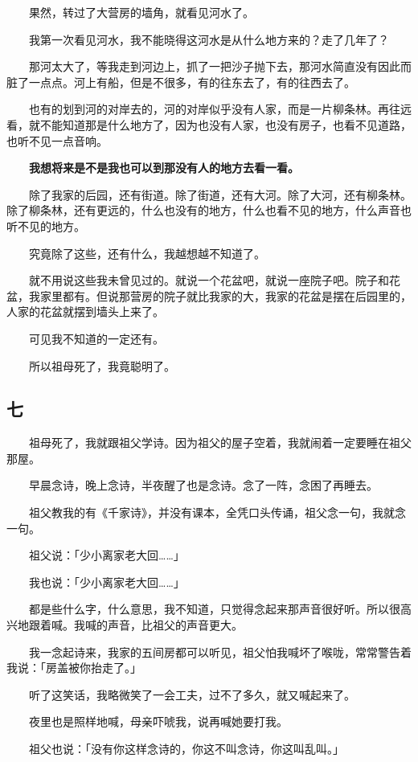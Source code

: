\documentclass[UTF8]{ctexart}
\begin{document}
　　果然，转过了大营房的墙角，就看见河水了。

　　我第一次看见河水，我不能晓得这河水是从什么地方来的？走了几年了？

　　那河太大了，等我走到河边上，抓了一把沙子抛下去，那河水简直没有因此而脏了一点点。河上有船，但是不很多，有的往东去了，有的往西去了。

　　也有的划到河的对岸去的，河的对岸似乎没有人家，而是一片柳条林。再往远看，就不能知道那是什么地方了，因为也没有人家，也没有房子，也看不见道路，也听不见一点音响。

　　\textbf{我想将来是不是我也可以到那没有人的地方去看一看。}

　　除了我家的后园，还有街道。除了街道，还有大河。除了大河，还有柳条林。除了柳条林，还有更远的，什么也没有的地方，什么也看不见的地方，什么声音也听不见的地方。

　　究竟除了这些，还有什么，我越想越不知道了。

　　就不用说这些我未曾见过的。就说一个花盆吧，就说一座院子吧。院子和花盆，我家里都有。但说那营房的院子就比我家的大，我家的花盆是摆在后园里的，人家的花盆就摆到墙头上来了。

　　可见我不知道的一定还有。

　　所以祖母死了，我竟聪明了。

\subsection{七}

　　祖母死了，我就跟祖父学诗。因为祖父的屋子空着，我就闹着一定要睡在祖父那屋。

　　早晨念诗，晚上念诗，半夜醒了也是念诗。念了一阵，念困了再睡去。

　　祖父教我的有《千家诗》，并没有课本，全凭口头传诵，祖父念一句，我就念一句。

　　祖父说：「少小离家老大回……」

　　我也说：「少小离家老大回……」

　　都是些什么字，什么意思，我不知道，只觉得念起来那声音很好听。所以很高兴地跟着喊。我喊的声音，比祖父的声音更大。

　　我一念起诗来，我家的五间房都可以听见，祖父怕我喊坏了喉咙，常常警告着我说：「房盖被你抬走了。」

　　听了这笑话，我略微笑了一会工夫，过不了多久，就又喊起来了。

　　夜里也是照样地喊，母亲吓唬我，说再喊她要打我。

　　祖父也说：「没有你这样念诗的，你这不叫念诗，你这叫乱叫。」
\end{document}
